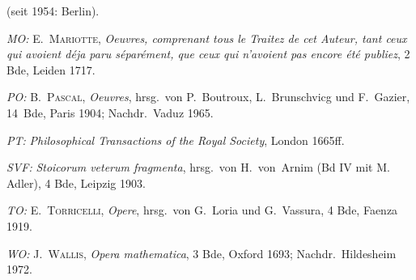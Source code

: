 (seit 1954: Berlin).\par
%
\noindent\hangindent=10mm\textit{MO:} E.\ \textsc{Mariotte}, \textit{Oeuvres, comprenant tous le Traitez de cet Auteur, tant ceux qui avoient déja paru séparément, que ceux qui n'avoient pas encore été publiez}, 2 Bde, Leiden 1717.\par
%
\noindent\hangindent=10mm\textit{PO:} B.\ \textsc{Pascal}, \textit{Oeuvres}, hrsg.\ von P.~Boutroux, L.~Brunschvicg und F.~Gazier, 14~Bde, Paris 1904; Nachdr.\ Vaduz 1965.\par
%
\noindent\hangindent=10mm\textit{PT:} %
\textit{Philosophical Transactions of the Royal Society}, London 1665ff.\par
%
%
\noindent\hangindent=10mm\textit{SVF:}
\textit{Stoicorum veterum fragmenta}, hrsg.\ von H.~von~Arnim (Bd IV mit M.\,Adler), 4 Bde, Leipzig 1903.\par
%
%
\noindent\hangindent=10mm\textit{TO:} E.\ \textsc{Torricelli}, \textit{Opere}, hrsg.\ von G.~Loria und G.~Vassura, 4 Bde, Faenza 1919.\par
%
\noindent\hangindent=10mm\textit{WO:} J.\ \textsc{Wallis}, \textit{Opera mathematica}, 3 Bde, Oxford 1693; Nachdr.\ Hildesheim 1972.\par
%
\vspace{6.0ex}

\newpage

